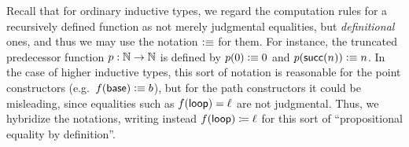 \documentclass[hott-all.tex]{subfiles}
\begin{document}
% 
% 
\begin{rmk}
Recall that for ordinary inductive types, we regard the computation rules for a recursively defined function as not merely judgmental equalities, but \emph{definitional} ones, and thus we may use the notation $\vcentcolon\equiv$ for them.
For instance, the truncated predecessor function $p:\mathbb{N}\to\mathbb{N}$ is defined by $p(0)\vcentcolon\equiv 0$ and $p(\mathsf{succ}(n))\vcentcolon\equiv n$.
In the case of higher inductive types, this sort of notation is reasonable for the point constructors (e.g.\ $f(\mathsf{base})\vcentcolon\equiv b$), but for the path constructors it could be misleading, since equalities such as ${f}\mathopen{}\left({\mathsf{loop}}\right)\mathclose{} = \ell$ are not judgmental.
Thus, we hybridize the notations, writing instead ${f}\mathopen{}\left({\mathsf{loop}}\right)\mathclose{} \coloneqq \ell$ for this sort of ``propositional equality by definition''.
\end{rmk}
\end{document}
